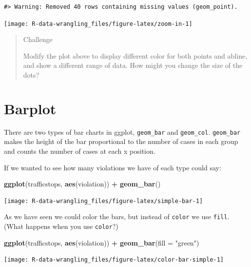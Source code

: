 \documentclass[]{book}
\newenvironment{Shaded}{\begin{snugshade}}{\end{snugshade}}
\newcommand{\DataTypeTok}[1]{\textcolor[rgb]{0.13,0.29,0.53}{#1}}
\newcommand{\KeywordTok}[1]{\textcolor[rgb]{0.13,0.29,0.53}{\textbf{#1}}}
\newcommand{\NormalTok}[1]{#1}
\newcommand{\OperatorTok}[1]{\textcolor[rgb]{0.81,0.36,0.00}{\textbf{#1}}}
\newcommand{\StringTok}[1]{\textcolor[rgb]{0.31,0.60,0.02}{#1}}
\begin{document}
\begin{verbatim}
#> Warning: Removed 40 rows containing missing values (geom_point).
\end{verbatim}

\texttt{[image: R-data-wrangling\_files/figure-latex/zoom-in-1]}

\begin{quote}
Challenge

Modify the plot above to display different color for both points and abline, and show a different range of data. How might you change the size of the dots?
\end{quote}

\hypertarget{barplot}{%
\section{Barplot}\label{barplot}}

There are two types of bar charts in ggplot, \texttt{geom\_bar} and \texttt{geom\_col}. \texttt{geom\_bar} makes the height of the bar proportional to the number of cases in each group and counts the number of cases at each x position.

If we wanted to see how many violations we have of each type could say:

\begin{Shaded}
\begin{Highlighting}[]
\KeywordTok{ggplot}\NormalTok{(trafficstops, }\KeywordTok{aes}\NormalTok{(violation)) }\OperatorTok{+}\StringTok{ }
\StringTok{  }\KeywordTok{geom_bar}\NormalTok{()}
\end{Highlighting}
\end{Shaded}

\texttt{[image: R-data-wrangling\_files/figure-latex/simple-bar-1]}

As we have seen we could color the bars, but instead of \texttt{color} we use \texttt{fill}. (What happens when you use \texttt{color}?)

\begin{Shaded}
\begin{Highlighting}[]
\KeywordTok{ggplot}\NormalTok{(trafficstops, }\KeywordTok{aes}\NormalTok{(violation)) }\OperatorTok{+}\StringTok{ }
\StringTok{  }\KeywordTok{geom_bar}\NormalTok{(}\DataTypeTok{fill =} \StringTok{"green"}\NormalTok{)}
\end{Highlighting}
\end{Shaded}

\texttt{[image: R-data-wrangling\_files/figure-latex/color-bar-simple-1]}
\end{document}

